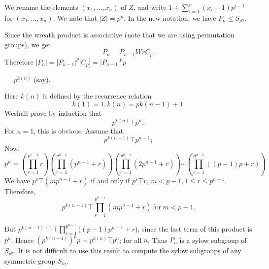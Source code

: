 We rename the elements $(x_1, \ldots, x_n)$ of $Z$, and write $1 +
\sum\limits^n_{i = 1} (x_i - 1) p^{i-1}$ for $(x_1, \ldots, x_n)$. We
note that $|Z| = p^n$. In the new notation, we have $P_n \le
S_{p^n}$. 

Since the wreath product is associative (note that we are using
permutation groups), we get 
$$
P_n = P_{n-1} W r C_p.
$$
Therefore $|P_n| = | P_{n-1} | ^p | C_p | = | P_{n-1} | ^p p$

\quad \qquad \qquad $= p^{k(n)}$ (say).

Here $k(n)$ is defined by the recurrence relation
$$
k(1) = 1, k(n) = p k (n-1) +1.
$$
We\pageoriginale shall prove by induction that 
$$
p^{k(n)} \top p^n;
$$
For $n=1$, this is obvious.  Assume that 
$$
p^{k(n-1)} \top p^{n-1};
$$
Now,
$$
p^n = \left( \prod^{p^{n-1}}_{r=1} r \right) \left(
\prod^{p^{n-1}}_{r=1}(p^{n-1}+r) \right) \left( \prod^{p^{n-1}}_{r=1}(2
p^{n-1} + r) \right) \cdots \left( \prod^{p^{n-1}}_{r=1}((p-1) p+r)
\right) 
$$
We have $p^s \top (mp^{n-1} + r)$ if and only if $p^s \top r$, $m <
p-1, 1 \le r \le p^{n-1}$. Therefore,  
$$
p^{k(n-1)} \top  \prod^{p^{n-1}}_{r=1} (m p^{n-1} + r) ~\text{for}~ m < p - 1.
$$

But $p^{k(n-1)+1} \top  \prod^{p^{n-1}}_{r=1} ((p-1) p^{n-1} + r$),
since the last term of this product is $p^n$. Hence $(p^{k(n-1)})^p p
= p^{k(n)} \top p^n$; for all $n$, Thus $P_n$ is a sylow subgroup of
$S_{p^n}$. It is not difficult to use this result to compute the sylow
subgroups of any symmetric group $S_m$.  
